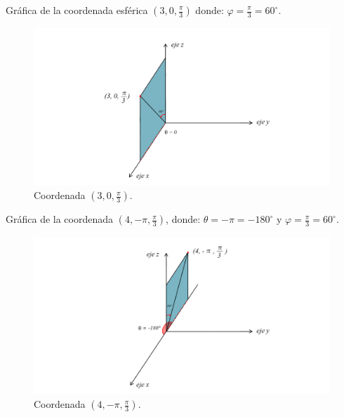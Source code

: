 \vspace{4mm}
Gráfica de la coordenada esférica ${\left( 3, 0,\frac{\pi}{3} \right)}$ donde: ${ \varphi = \frac{\pi}{3} = 60^{\circ} }$.
\begin{figure}[H]
  \centering
  \includegraphics[width=11.17cm, height=5.97cm]{img/graph/grafica_2.jpg}
  \caption{Coordenada ${\left( 3, 0,\frac{\pi}{3} \right)}$.}
\end{figure}

\vspace{4mm}
Gráfica de la coordenada ${\left( 4, -\pi,\frac{\pi}{3} \right)}$, donde: ${\theta = -\pi = -180^{\circ} \text{ y } \varphi = \frac{\pi}{3} = 60^{\circ} }$.
\begin{figure}[H]
  \centering
  \includegraphics[width=11.17cm, height=5.97cm]{img/graph/grafica_3.jpg}
  \caption{Coordenada ${\left( 4, -\pi,\frac{\pi}{3} \right)}$.}
\end{figure}
